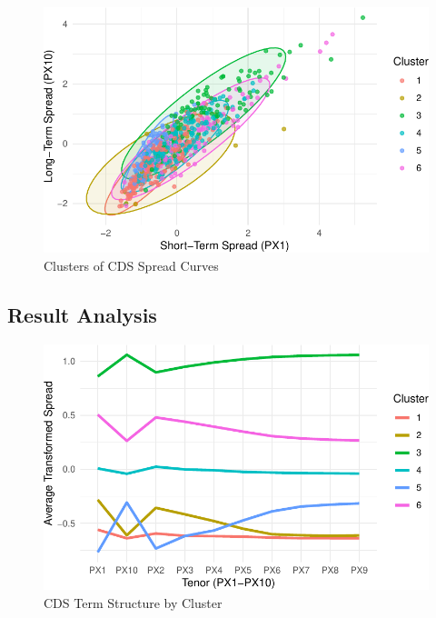 \documentclass[
  letterpaper,
  DIV=11,
  numbers=noendperiod]{scrartcl}
\begin{document}
\begin{figure}

{\centering \includegraphics{437_final_project_files/figure-pdf/fig-cluster-1.pdf}

}

\caption{\label{fig-cluster}Clusters of CDS Spread Curves}

\end{figure}

\hypertarget{result-analysis}{%
\subsection{Result Analysis}\label{result-analysis}}

\begin{figure}

{\centering \includegraphics{437_final_project_files/figure-pdf/fig-trend-1.pdf}

}

\caption{\label{fig-trend}CDS Term Structure by Cluster}

\end{figure}
\end{document}
